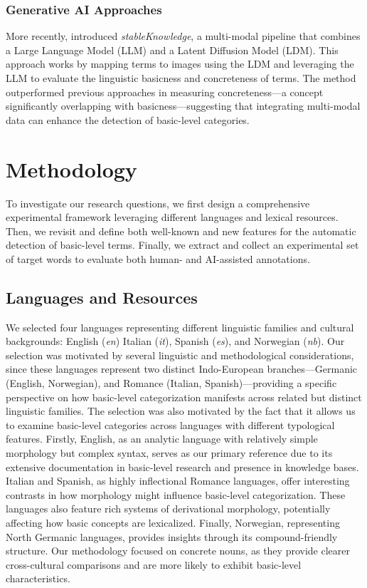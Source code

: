 \documentclass[preprint,12pt,authoryear]{elsarticle}
\begin{document}
\subsubsection{Generative AI Approaches}

More recently, \citet{torrielli_how_2023} introduced \textit{stableKnowledge}, a multi-modal pipeline that combines a Large Language Model (LLM) and a Latent Diffusion Model (LDM). This approach works by mapping terms to images using the LDM and leveraging the LLM to evaluate the linguistic basicness and concreteness of terms. The method outperformed previous approaches in measuring concreteness---a concept significantly overlapping with basicness---suggesting that integrating multi-modal data can enhance the detection of basic-level categories.

\section{Methodology}

To investigate our research questions, we first design a comprehensive experimental framework leveraging different languages and lexical resources. Then, we revisit and define both well-known and new features for the automatic detection of basic-level terms. Finally, we extract and collect an experimental set of target words to evaluate both human- and AI-assisted annotations.

\subsection{Languages and Resources}
We selected four languages representing different linguistic families and cultural backgrounds: English (\textit{en}) Italian (\textit{it}), Spanish (\textit{es}), and Norwegian (\textit{nb}). Our selection was motivated by several linguistic and methodological considerations, since these languages represent two distinct Indo-European branches---Germanic (English, Norwegian), and Romance (Italian, Spanish)---providing a specific perspective on how basic-level categorization manifests across related but distinct linguistic families. The selection was also motivated by the fact that it allows us to examine basic-level categories across languages with different typological features. Firstly, English, as an analytic language with relatively simple morphology but complex syntax, serves as our primary reference due to its extensive documentation in basic-level research and presence in knowledge bases. Italian and Spanish, as highly inflectional Romance languages, offer interesting contrasts in how morphology might influence basic-level categorization. These languages also feature rich systems of derivational morphology, potentially affecting how basic concepts are lexicalized. Finally, Norwegian, representing North Germanic languages, provides insights through its compound-friendly structure.
Our methodology focused on concrete nouns, as they provide clearer cross-cultural comparisons and are more likely to exhibit basic-level characteristics.
\end{document}
